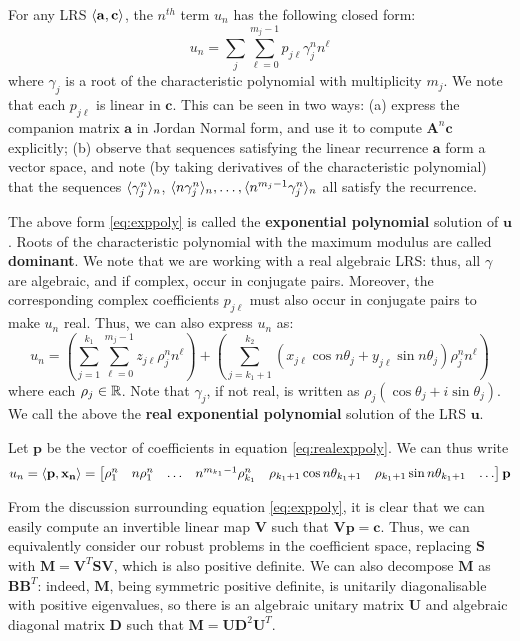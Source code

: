 For any LRS $\langle\mathbf{a}, \mathbf{c}\rangle$, the $n^{th}$ term $u_n$ has the following closed form:
\begin{equation}
\label{eq:exppoly}
u_n = \sum_{j}\sum_{\ell=0}^{m_j - 1}p_{j\ell}\gamma_j^n n^\ell
\end{equation}
where $\gamma_j$ is a root of the characteristic polynomial with multiplicity $m_j$. We note that each $p_{j\ell}$ is linear in $\mathbf{c}$. This can be seen in two ways: (a) express the companion matrix $\mathbf{a}$ in Jordan Normal form, and use it to compute $\mathbf{A}^n\mathbf{c}$ explicitly; (b) observe that sequences satisfying the linear recurrence $\mathbf{a}$ form a vector space, and note (by taking derivatives of the characteristic polynomial) that the sequences $\langle\gamma_j^n\rangle_n$, $\langle n\gamma_j^n\rangle_n, \dots, \langle n^{m_j-1}\gamma_j^n\rangle_n$ all satisfy the recurrence. 

The above form \ref{eq:exppoly} is called the \textbf{exponential polynomial} solution of $\mathbf{u}$. Roots of the characteristic polynomial with the maximum modulus are called \textbf{dominant}. We note that we are working with a real algebraic LRS: thus, all $\gamma$ are algebraic, and if complex, occur in conjugate pairs. Moreover, the corresponding complex coefficients $p_{j\ell}$ must also occur in conjugate pairs to make $u_n$ real. Thus, we can also express $u_n$ as:
\begin{equation}
\label{eq:realexppoly}
u_n = \left(\sum_{j=1}^{k_1}\sum_{\ell = 0}^{m_j-1} z_{j\ell}\rho_j^n n^\ell\right) + \left(\sum_{j=k_1 + 1}^{k_2}  (x_{j\ell} \cos n\theta_j + y_{j\ell}\sin n\theta_j)\rho_j^n n^\ell\right)
\end{equation}
where each $\rho_j \in \mathbb{R}$. Note that $\gamma_j$, if not real, is written as $\rho_j(\cos \theta_j + i\sin \theta_j)$. We call the above the \textbf{real exponential polynomial} solution of the LRS $\mathbf{u}$. 

Let $\mathbf{p}$ be the vector of coefficients in equation \ref{eq:realexppoly}. We can thus write
\begin{equation}
\label{eq:innerprod}
u_n = \langle\mathbf{p}, \mathbf{x_n}\rangle= 
\begin{bmatrix}
\rho_1^n & n \rho_1^n & \dots & n^{m_{k_1}-1}\rho_{k_1}^n & \rho_{k_1+1}\cos n\theta_{k_1+1} & \rho_{k_1+1}\sin n\theta_{k_1+1} & \dots
\end{bmatrix}\mathbf{p}
\end{equation}

From the discussion surrounding equation \ref{eq:exppoly}, it is clear that we can easily compute an invertible linear map $\mathbf{V}$ such that $\mathbf{Vp} = \mathbf{c}$. Thus, we can equivalently consider our robust problems in the coefficient space, replacing $\mathbf{S}$ with $\mathbf{M} = \mathbf{V}^T\mathbf{SV}$, which is also positive definite. We can also decompose $\mathbf{M}$ as $\mathbf{B}\mathbf{B}^T$: indeed, $\mathbf{M}$, being symmetric positive definite, is unitarily diagonalisable with positive eigenvalues, so there is an algebraic unitary matrix $\mathbf{U}$ and algebraic diagonal matrix $\mathbf{D}$ such that $\mathbf{M} = \mathbf{U}\mathbf{D}^2\mathbf{U}^T$.

